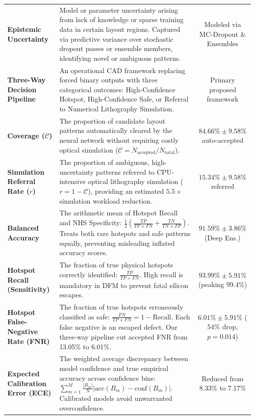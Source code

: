 \documentclass[conference]{IEEEtran}
\begin{document}
\begin{table}[t]
\begin{tabular}{p{4.2cm}p{10.5cm}c}
\addlinespace
\textbf{Epistemic Uncertainty} & Model or parameter uncertainty arising from lack of knowledge or sparse training data in certain layout regions. Captured via predictive variance over stochastic dropout passes or ensemble members, identifying novel or ambiguous patterns. & Modeled via MC-Dropout \& Ensembles \\
\addlinespace
\textbf{Three-Way Decision Pipeline} & An operational CAD framework replacing forced binary outputs with three categorical outcomes: High-Confidence Hotspot, High-Confidence Safe, or Referral to Numerical Lithography Simulation. & Primary proposed framework \\
\addlinespace
\textbf{Coverage ($\mathcal{C}$)} & The proportion of candidate layout patterns automatically cleared by the neural network without requiring costly optical simulation ($\mathcal{C} = N_{\text{accepted}} / N_{\text{total}}$). & $84.66\% \pm 9.58\%$ auto-accepted \\
\addlinespace
\textbf{Simulation Referral Rate ($r$)} & The proportion of ambiguous, high-uncertainty patterns referred to CPU-intensive optical lithography simulation ($r = 1 - \mathcal{C}$), providing an estimated $5.5\times$ simulation workload reduction. & $15.34\% \pm 9.58\%$ referred \\
\addlinespace
\textbf{Balanced Accuracy} & The arithmetic mean of Hotspot Recall and NHS Specificity: $\frac{1}{2}\left(\frac{TP}{TP+FN} + \frac{TN}{TN+FP}\right)$. Treats both rare hotspots and safe patterns equally, preventing misleading inflated accuracy scores. & $91.59\% \pm 3.86\%$ (Deep Ens.) \\
\addlinespace
\textbf{Hotspot Recall (Sensitivity)} & The fraction of true physical hotspots correctly identified: $\frac{TP}{TP+FN}$. High recall is mandatory in DFM to prevent fatal silicon escapes. & $93.99\% \pm 5.91\%$ (peaking 99.4\%) \\
\addlinespace
\textbf{Hotspot False-Negative Rate (FNR)} & The fraction of true hotspots erroneously classified as safe: $\frac{FN}{TP+FN} = 1 - \text{Recall}$. Each false negative is an escaped defect. Our three-way pipeline cut accepted FNR from 13.05\% to 6.01\%. & $6.01\% \pm 5.91\%$ ($54\%$ drop, $p=0.014$) \\
\addlinespace
\textbf{Expected Calibration Error (ECE)} & The weighted average discrepancy between model confidence and true empirical accuracy across confidence bins: $\sum_{m=1}^M \frac{|B_m|}{N} |\text{acc}(B_m) - \text{conf}(B_m)|$. Calibrated models avoid unwarranted overconfidence. & Reduced from 8.33\% to 7.17\% \\

\end{tabular}
\end{table}
\end{document}
